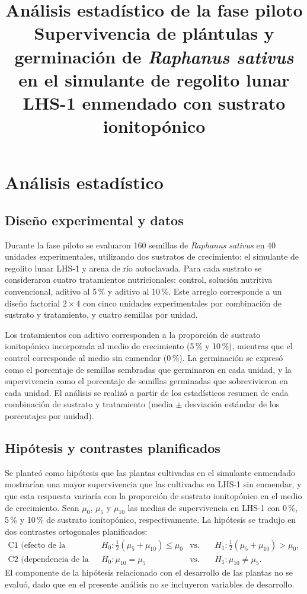 \documentclass[11pt]{article}
\title{\textbf{Análisis estadístico de la fase piloto}\\[4pt]
\large Supervivencia de plántulas y germinación de \textit{Raphanus sativus} en el simulante de regolito lunar LHS-1 enmendado con sustrato ionitopónico}
\author{}
\date{}
\begin{document}
\maketitle
\vspace{-3em}

\section{Análisis estadístico}

\subsection{Diseño experimental y datos}

Durante la fase piloto se evaluaron 160 semillas de \textit{Raphanus sativus} en 40 unidades experimentales, utilizando dos sustratos de crecimiento: el simulante de regolito lunar LHS-1 y arena de río autoclavada. Para cada sustrato se consideraron cuatro tratamientos nutricionales: control, solución nutritiva convencional, aditivo al 5\,\% y aditivo al 10\,\%. Este arreglo corresponde a un diseño factorial $2 \times 4$ con cinco unidades experimentales por combinación de sustrato y tratamiento, y cuatro semillas por unidad.

Los tratamientos con aditivo corresponden a la proporción de sustrato ionitopónico incorporada al medio de crecimiento (5\,\% y 10\,\%), mientras que el control corresponde al medio sin enmendar (0\,\%). La germinación se expresó como el porcentaje de semillas sembradas que germinaron en cada unidad, y la supervivencia como el porcentaje de semillas germinadas que sobrevivieron en cada unidad. El análisis se realizó a partir de los estadísticos resumen de cada combinación de sustrato y tratamiento (media $\pm$ desviación estándar de los porcentajes por unidad).

\subsection{Hipótesis y contrastes planificados}

Se planteó como hipótesis que las plantas cultivadas en el simulante enmendado mostrarían una mayor supervivencia que las cultivadas en LHS-1 sin enmendar, y que esta respuesta variaría con la proporción de sustrato ionitopónico en el medio de crecimiento. Sean $\mu_0$, $\mu_5$ y $\mu_{10}$ las medias de supervivencia en LHS-1 con 0\,\%, 5\,\% y 10\,\% de sustrato ionitopónico, respectivamente. La hipótesis se tradujo en dos contrastes ortogonales planificados:
\begin{align*}
\text{C1 (efecto de la enmienda):} \quad & H_0\colon \tfrac{1}{2}(\mu_5 + \mu_{10}) \le \mu_0 & \text{vs.} \quad & H_1\colon \tfrac{1}{2}(\mu_5 + \mu_{10}) > \mu_0,\\[2pt]
\text{C2 (dependencia de la proporción):} \quad & H_0\colon \mu_{10} = \mu_5 & \text{vs.} \quad & H_1\colon \mu_{10} \ne \mu_5.
\end{align*}
El componente de la hipótesis relacionado con el desarrollo de las plantas no se evaluó, dado que en el presente análisis no se incluyeron variables de desarrollo.
\end{document}
